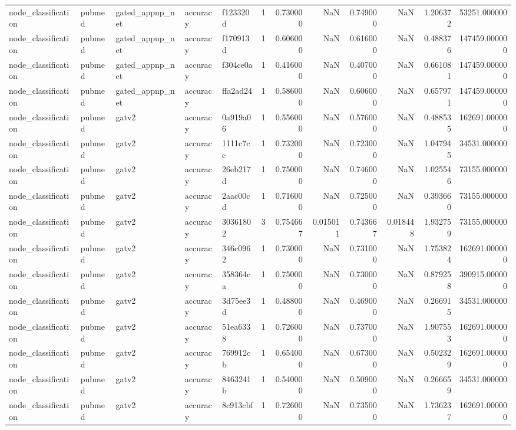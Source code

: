 \begin{tabular}{lllllrrrrrrr}
node_classification & pubmed & gated_appnp_net & accuracy & f123320d & 1 & 0.730000 & NaN & 0.749000 & NaN & 1.206372 & 53251.000000 \\
node_classification & pubmed & gated_appnp_net & accuracy & f170913d & 1 & 0.606000 & NaN & 0.616000 & NaN & 0.488376 & 147459.000000 \\
node_classification & pubmed & gated_appnp_net & accuracy & f304ce0a & 1 & 0.416000 & NaN & 0.407000 & NaN & 0.661081 & 147459.000000 \\
node_classification & pubmed & gated_appnp_net & accuracy & ffa2ad24 & 1 & 0.586000 & NaN & 0.606000 & NaN & 0.657971 & 147459.000000 \\
node_classification & pubmed & gatv2 & accuracy & 0a919a06 & 1 & 0.556000 & NaN & 0.576000 & NaN & 0.488535 & 162691.000000 \\
node_classification & pubmed & gatv2 & accuracy & 1111c7cc & 1 & 0.732000 & NaN & 0.723000 & NaN & 1.047945 & 34531.000000 \\
node_classification & pubmed & gatv2 & accuracy & 26eb217d & 1 & 0.750000 & NaN & 0.746000 & NaN & 1.025546 & 73155.000000 \\
node_classification & pubmed & gatv2 & accuracy & 2aac00cd & 1 & 0.716000 & NaN & 0.725000 & NaN & 0.393660 & 73155.000000 \\
node_classification & pubmed & gatv2 & accuracy & 30361802 & 3 & 0.754667 & 0.015011 & 0.743667 & 0.018448 & 1.932759 & 73155.000000 \\
node_classification & pubmed & gatv2 & accuracy & 346c0962 & 1 & 0.730000 & NaN & 0.731000 & NaN & 1.753824 & 162691.000000 \\
node_classification & pubmed & gatv2 & accuracy & 358364ca & 1 & 0.750000 & NaN & 0.730000 & NaN & 0.879258 & 390915.000000 \\
node_classification & pubmed & gatv2 & accuracy & 3d75ee3d & 1 & 0.488000 & NaN & 0.469000 & NaN & 0.266915 & 34531.000000 \\
node_classification & pubmed & gatv2 & accuracy & 51ea6338 & 1 & 0.726000 & NaN & 0.737000 & NaN & 1.907553 & 162691.000000 \\
node_classification & pubmed & gatv2 & accuracy & 769912cb & 1 & 0.654000 & NaN & 0.673000 & NaN & 0.502329 & 162691.000000 \\
node_classification & pubmed & gatv2 & accuracy & 8463241b & 1 & 0.540000 & NaN & 0.509000 & NaN & 0.266659 & 34531.000000 \\
node_classification & pubmed & gatv2 & accuracy & 8c913cbf & 1 & 0.726000 & NaN & 0.735000 & NaN & 1.736237 & 162691.000000 \\

\end{tabular}

